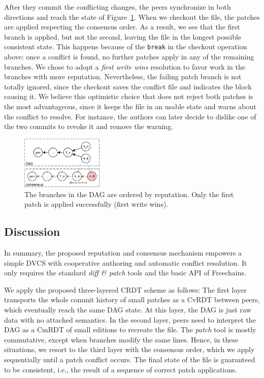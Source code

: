 \documentclass[10pt,journal,compsoc]{IEEEtran}
\newcommand{\FC}       {Freechains\xspace}
\newcommand{\code}[1]  {\texttt{\footnotesize{#1}}}
\begin{document}
After they commit the conflicting changes, the peers synchronize in both
directions and reach the state of Figure~\ref{fig.conflict}.
When we checkout the file, the patches are applied respecting the consensus
order.
As a result, we see that the first branch is applied, but not the second,
leaving the file in the longest possible consistent state.
%
This happens because of the \code{break} in the checkout operation above:
once a conflict is found, no further patches apply in any of the remaining
branches.
%
We chose to adopt a \emph{first write wins} resolution to favor work in the
branches with more reputation.
Nevertheless, the failing patch branch is not totally ignored, since the
checkout saves the conflict file and indicates the block causing it.
%
We believe this optimistic choice that does not reject both patches is the most
advantageous, since it keeps the file in an usable state and warns about the
conflict to resolve.
For instance, the authors can later decide to dislike one of the two commits to
revoke it and remove the warning.

\begin{figure}
\centering
\includegraphics[width=0.35\textwidth]{conflict.png}
\caption{
    The branches in the DAG are ordered by reputation.
    Only the first patch is applied successfully (first write wins).
}
\label{fig.conflict}
\end{figure}

\subsection{Discussion}

In summary, the proposed reputation and consensus mechanism empowers a simple
DVCS with cooperative authoring and automatic conflict resolution.
It only requires the standard \emph{diff \& patch} tools and the basic API of
\FC.

We apply the proposed three-layered CRDT scheme as follows:
The first layer transports the whole commit history of small patches as a CvRDT
between peers, which eventually reach the same DAG state.
At this layer, the DAG is just raw data with no attached semantics.
%
In the second layer, peers need to interpret the DAG as a CmRDT of small
editions to recreate the file.
The \emph{patch} tool is mostly commutative, except when branches modify the
same lines.
%
Hence, in these situations, we resort to the third layer with the consensus
order, which we apply sequentially until a patch conflict occurs.
The final state of the file is guaranteed to be consistent, i.e., the result of
a sequence of correct patch applications.
\end{document}
